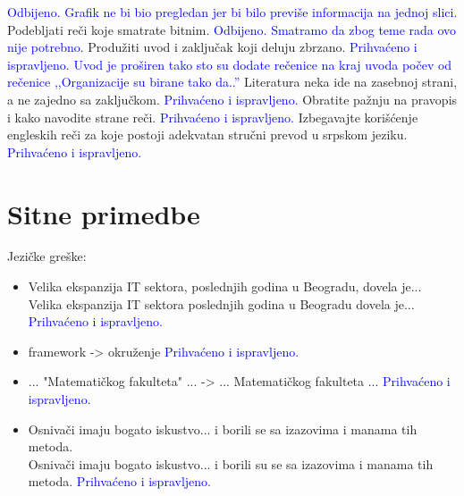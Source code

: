 \documentclass[a4paper]{report}
\newcommand{\odgovor}[1]{\textcolor{blue}{#1}}
\begin{document}
\odgovor{Odbijeno. Grafik ne bi bio pregledan jer bi bilo previše informacija na jednoj slici.}
Podebljati reči koje smatrate bitnim. \odgovor{Odbijeno. Smatramo da zbog teme rada ovo nije potrebno.}
Produžiti uvod i zaključak koji deluju zbrzano.  \odgovor{Prihvaćeno i ispravljeno. Uvod je proširen tako sto su dodate rečenice na kraj uvoda počev od rečenice ,,Organizacije su birane tako da..''}
Literatura neka ide na zasebnoj strani, a ne zajedno sa zaključkom. \odgovor{Prihvaćeno i ispravljeno.}
Obratite pažnju na pravopis i kako navodite strane reči. \odgovor{Prihvaćeno i ispravljeno.}
Izbegavajte korišćenje engleskih reči za koje postoji adekvatan stručni prevod u srpskom jeziku. \odgovor{Prihvaćeno i ispravljeno.}

\section{Sitne primedbe}
Jezičke greške: \begin{itemize}
\item Velika ekspanzija IT sektora, poslednjih godina u Beogradu, dovela je...\\
      Velika ekspanzija IT sektora poslednjih godina u Beogradu dovela je...
      \odgovor{Prihvaćeno i ispravljeno.}
\item framework -> okruženje 
\odgovor{Prihvaćeno i ispravljeno.}
\item ... "Matematičkog fakulteta" ... -> ... Matematičkog fakulteta ... 
\odgovor{Prihvaćeno i ispravljeno.}
\item Osnivači imaju bogato iskustvo... i borili se sa izazovima i manama tih metoda. \\
      Osnivači imaju bogato iskustvo... i borili su se sa izazovima i manama tih metoda.
       \odgovor{Prihvaćeno i ispravljeno.}
\end{itemize}
\end{document}
